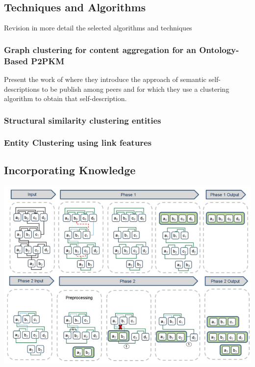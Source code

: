 \documentclass[runningheads]{llncs}
\begin{document}

\subsection{Techniques and Algorithms}\label{algorithms}
Revision in more detail the selected algorithms and techniques 


\subsubsection{Graph clustering for content aggregation for an Ontology-Based P2PKM}\label{content-aggregation}
Present the work of \cite{Schmitz} where they introduce the approach of semantic self-descriptions to be publish among peers and for which they use a clustering algorithm to obtain that self-description.


\subsubsection{Structural similarity clustering entities} \label{structural-similarity}


\subsubsection{Entity Clustering using link features} \label{entity-clustering}

\subsection{Incorporating Knowledge }



\begin{center}
\includegraphics[width=1\textwidth]{clip_example.png}
\end{center}
\end{document}
